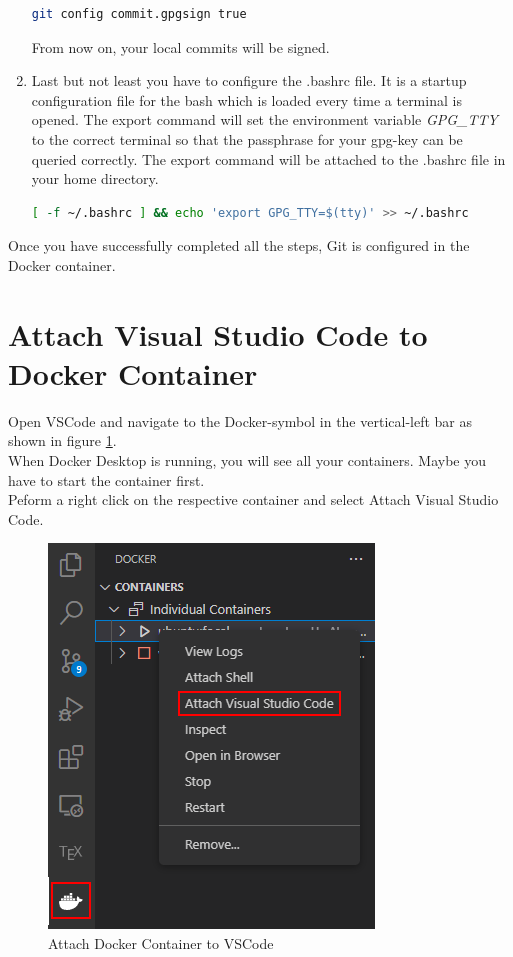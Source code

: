 \begin{enumerate}
            \begin{lstlisting}[language=bash] 
git config commit.gpgsign true
            \end{lstlisting} 
        From now on, your local commits will be signed.   
        \item Last but not least you have to configure the .bashrc file. It is a startup configuration file for the \ac{bash} which is loaded every time a terminal is opened. The export command will set the environment variable \textit{GPG\_TTY} to the correct terminal so that the passphrase for your \ac{gpg}-key can be queried correctly. The export command will be attached  to the .bashrc file in your home directory.  
            \begin{lstlisting}[language=bash] 
[ -f ~/.bashrc ] && echo 'export GPG_TTY=$(tty)' >> ~/.bashrc
            \end{lstlisting}
    \end{enumerate}
    Once you have successfully completed all the steps, Git is configured in the Docker container. 

    \section{Attach Visual Studio Code to Docker Container}
        Open VSCode and navigate to the Docker-symbol in the vertical-left bar as shown in figure \ref{fig:attach_vscode}. \\
        When Docker Desktop is running, you will see all your containers. Maybe you have to start the container first. \\
        Peform a right click on the respective container and select \glqq Attach Visual Studio Code\grqq. 
        \begin{figure}[h]
            \centering
            \includegraphics[scale=0.7]{images/attach_VSCode.png}
            \caption{Attach Docker Container to VSCode}
            \label{fig:attach_vscode}
        \end{figure}
        
